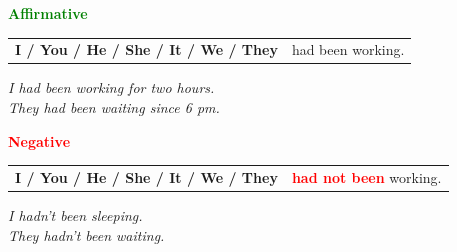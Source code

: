 \documentclass[a4paper,10pt]{article}
\newcommand{\sectiontitle}[2]{%
  {\large\bfseries\textcolor{#1}{#2}}%
}
\begin{document}
\begin{minipage}[t]{.485\textwidth}
\begin{greenbox}
  \sectiontitle{Green}{Affirmative}

  \vspace{0.75mm}
  \begin{tabular}{@{}>{\bfseries}l l@{}}
    I / You / He / She / It / We / They & had been working.\\
    
  \end{tabular}

  \vspace{0.75mm}
  \textit{I had been working for two hours.}\\[-1mm]
  \textit{They had been waiting since 6 pm.}
\end{greenbox}
\end{minipage}
\hfill
\begin{minipage}[t]{.485\textwidth}
\begin{redbox}
  \sectiontitle{Red}{Negative}

  \vspace{0.75mm}
  \begin{tabular}{@{}>{\bfseries}l l@{}}
    I / You / He / She / It / We / They & \textcolor{Red}{\bfseries had not been} working.\\
    
  \end{tabular}

  \vspace{0.75mm}
  \textit{I hadn't been sleeping.}\\[-1mm]
  \textit{They hadn't been waiting.}
\end{redbox}
\end{minipage}

\vspace{1.35mm}
\end{document}

